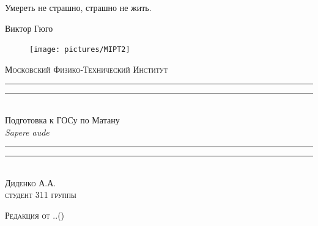 \newpage
\thispagestyle{empty}
\begingroup
{}
\epigraph{Умереть не страшно, страшно не жить.}{Виктор Гюго}\centering

\settowidth{\unitlength}{\LARGE\scshape Московский Физико-Технический Институт}
\vspace{-2.2\baselineskip}
\begin{figure}[!h]
\center
\texttt{[image: pictures/MIPT2]}
\end{figure}
\vspace*{0.5\baselineskip}
{\LARGE\scshape Московский Физико-Технический Институт}\\[0.7\baselineskip]
\rule{\unitlength}{1.6pt}\vspace*{-\baselineskip}\vspace*{2pt}
\rule{\unitlength}{0.4pt}\\[1.4\baselineskip]
{\Huge Подготовка к ГОСу по Матану}\\[\baselineskip]
{\large \itshape Sapere aude}\\[0.8\baselineskip]
\rule{\unitlength}{0.4pt}\vspace*{-1.5\baselineskip}\vspace{3.2pt}
\rule{\unitlength}{1.6pt}\\[\baselineskip]
{\Large\scshape Диденко А.А. \\\vspace*{0.2\baselineskip}  \normalsize студент 311 группы}\par
\vspace*{\baselineskip}  

{\LARGE\scshape Редакция от \twodigit\day.\twodigit\month.\the\year \;(\currenttime)}\par %

\bigskip
\vfill

